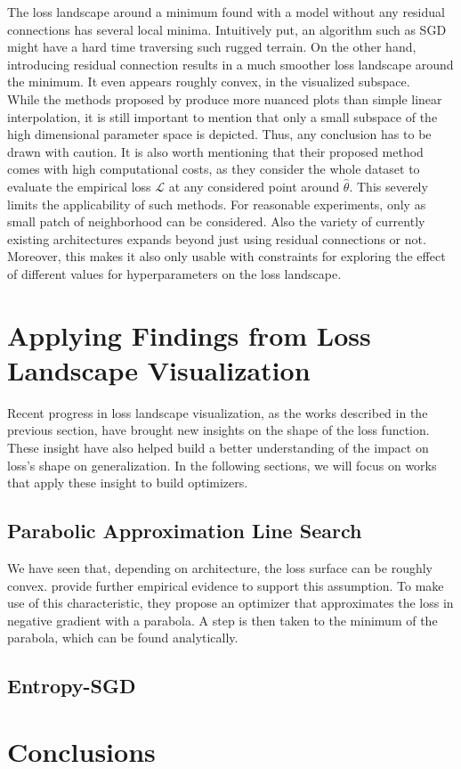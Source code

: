 \documentclass[a4paper]{scrartcl}
\begin{document}
The loss landscape around a minimum found with a model without any residual connections has several local minima. Intuitively put, an algorithm such as SGD might have a hard time traversing such rugged terrain. On the other hand, introducing residual connection results in a much smoother loss landscape around the minimum. It even appears roughly convex, in the visualized subspace.\\
While the methods proposed by \cite{li2017visualizing} produce more nuanced plots than simple linear interpolation, it is still important to mention that only a small subspace of the high dimensional parameter space is depicted. Thus, any conclusion has to be drawn with caution. It is also worth mentioning that their proposed method comes with high computational costs, as they consider the whole dataset to evaluate the empirical loss $\mathcal{L}$ at any considered point around $\hat{\theta}$. This 
severely limits the applicability of such methods. For reasonable experiments, only as small patch of neighborhood can be considered. Also the variety of currently existing architectures expands beyond just using residual connections or not. Moreover, this makes it also only usable with constraints for exploring the effect of different values for hyperparameters on the loss landscape.









\section*{Applying Findings from Loss Landscape Visualization}
Recent progress in loss landscape visualization, as the works described in the previous section, have brought new insights on the shape of the loss function. These insight have also helped build a better understanding of the impact on loss's shape on generalization. In the following sections, we will focus on works that apply these insight to build optimizers.


\subsection*{Parabolic Approximation Line Search}
We have seen that, depending on architecture, the loss surface can be roughly convex. \cite{mutschler2020parabolic} provide further empirical evidence to support this assumption. To make use of this characteristic, they propose an optimizer that approximates the loss in negative gradient with a parabola. A step is then taken to the minimum of the parabola, which can be found analytically.




\subsection*{Entropy-SGD}


\section*{Conclusions}




	
\end{document}

